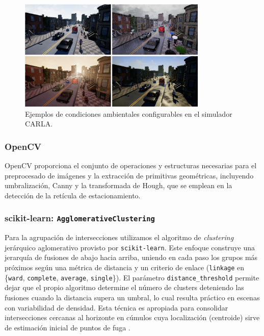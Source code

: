 \begin{figure}[!ht]
	\centering
	\includegraphics[width=0.8\textwidth]{img/carla_clima_example}
	\caption{Ejemplos de condiciones ambientales configurables en el simulador CARLA.}
	\label{fig:carla-simulator-teo}
\end{figure}

\subsubsection{OpenCV}
\noindent
OpenCV proporciona el conjunto de operaciones y estructuras necesarias para el preprocesado de imágenes y la extracción de primitivas geométricas, incluyendo umbralización, Canny y la transformada de Hough, que se emplean en la detección de la retícula de estacionamiento.

\subsubsection{scikit-learn: \texttt{AgglomerativeClustering}}\label{sec:sklearn-agglomerative}
\noindent
Para la agrupación de intersecciones utilizamos el algoritmo de \emph{clustering} jerárquico aglomerativo provisto por \texttt{scikit-learn}.
Este enfoque construye una jerarquía de fusiones de abajo hacia arriba, uniendo en cada paso los grupos más próximos según
una métrica de distancia y un criterio de enlace (\texttt{linkage} en \{\texttt{ward}, \texttt{complete}, \texttt{average}, \texttt{single}\}).
El parámetro \texttt{distance\_threshold} permite dejar que el propio algoritmo determine el número de clusters deteniendo
las fusiones cuando la distancia supera un umbral, lo cual resulta práctico en escenas con variabilidad de densidad.
Esta técnica es apropiada para consolidar intersecciones cercanas al horizonte en cúmulos cuya localización (centroide)
sirve de estimación inicial de puntos de fuga \cite{tan2005introduction}.

